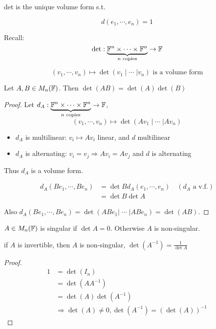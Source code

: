 \documentclass[a4paper]{article}
\begin{document}
\begin{cor} det is the unique volume form s.t.
	
	\[ d(e_{1},\cdots,e_{n})  = 1\]
	
\end{cor}


Recall: 	\[ \det : \underbrace{\mathbb{F}^{n} \times \cdots \times \mathbb{F}^{n}}_{n \text{ copies}} \to \mathbb{F}  \]

\[ (v_{1},\cdots,v_{n}) \mapsto \det (v_{1} \; | \; \cdots \; | v_{n}) \text{ is a volume form} \]


\begin{prop} 
	Let $ A,B \in M_{n}(\mathbb{F}) $. Then $ \det(AB) = \det(A)\det(B) $
\end{prop}

\begin{proof}
	Let $ d_{A}: \underbrace{\mathbb{F}^{n} \times \cdots \times \mathbb{F}^{n}}_{n \text{ copies}} \to \mathbb{F}  $,
	\[ (v_{1},\cdots,v_{n}) \mapsto \det (Av_{1} \; | \; \cdots \; | Av_{n}) \]
	
	\begin{itemize}
		\item $ d_{A} $ is multilinear: $ v_{i} \mapsto Av_{i} $ linear, and $ d $ multilinear
		\item $ d_{A} $ is alternating: $ v_{i} = v_{j} \Rightarrow A v_{i} = A v_{j} $ and $ d $ is alternating 
	\end{itemize}
	Thus $ d_{A} $ is a volume form. 
	
	
	\begin{align*}
	d_{A} (Be_{1},\cdots,Be_{n}) & = \det B d_{A} (e_{1},\cdots,e_{n}) \quad (d_{A} \text{ a v.f.}) \\
	& = \det B \det A
	\end{align*}
	
	Also $ d_{A}(Be_{1},\cdots,Be_{n}) = \det(AB e_{1} | \; \cdots \; | A B e_{n}) = \det (AB) $. 
	
	
	
\end{proof}
	
	
\begin{defi}
	$ A \in M_{n}(\mathbb{F}) $ is singular if $ \det A = 0 $. Otherwise $ A $ is non-singular. 
\end{defi}

\begin{lemma} 
	if $ A $ is invertible, then $ A $ is non-singular, $ \det(A^{-1}) = \frac{1}{\det A} $
\end{lemma}

\begin{proof}
	\begin{align*}
	1 & = \det(I_{n}) \\
	& = \det(A A^{-1}) \\
	& = \det(A)\det(A^{-1}) \\
	& \Rightarrow \det(A) \neq 0, \det(A^{-1}) = (\det(A))^{-1}
	\end{align*}
\end{proof}
\end{document}
